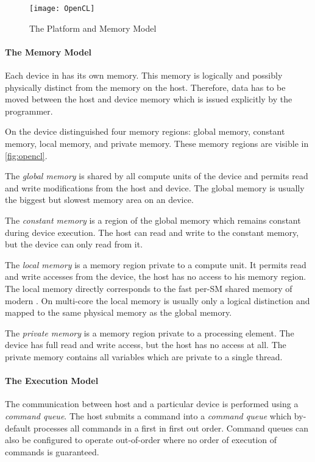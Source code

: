 \begin{figure}
  \centering
  \texttt{[image: OpenCL]}
  \caption{The \OpenCL Platform and Memory Model}
  \label{fig:opencl}
\end{figure}

\paragraph{The \OpenCL Memory Model}
Each device in \OpenCL has its own memory.
This memory is logically and possibly physically distinct from the memory on the host.
Therefore, data has to be moved between the host and device memory which is issued explicitly by the programmer.

On the device \OpenCL distinguished four memory regions:
global memory, constant memory, local memory, and private memory.
These memory regions are visible in \autoref{fig:opencl}.

The \emph{global memory} is shared by all compute units of the device and permits read and write modifications from the host and device.
The global memory is usually the biggest but slowest memory area on an \OpenCL device.

The \emph{constant memory} is a region of the global memory which remains constant during device execution.
The host can read and write to the constant memory, but the device can only read from it.

The \emph{local memory} is a memory region private to a compute unit.
It permits read and write accesses from the device, the host has no access to his memory region.
The local memory directly corresponds to the fast per-SM shared memory of modern \GPUs.
On multi-core \CPUs the local memory is usually only a logical distinction and mapped to the same physical memory as the global memory.

The \emph{private memory} is a memory region private to a processing element.
The device has full read and write access, but the host has no access at all.
The private memory contains all variables which are private to a single thread.


\paragraph{The \OpenCL Execution Model}
The communication between host and a particular device is performed using a \emph{command queue}.
The host submits a command into a \emph{command queue} which by-default processes all commands in a first in first out order.
Command queues can also be configured to operate out-of-order where no order of execution of commands is guaranteed.


